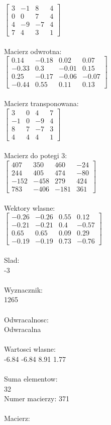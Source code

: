 \documentclass[a4paper,12pt]{article}
\begin{document}
$\begin{bmatrix} 3&-1&8&4\\0&0&7&4\\4&-9&-7&4\\7&4&3&1 \end{bmatrix}$
\\
\\
Macierz odwrotna:\\

$\begin{bmatrix} 0.14&-0.18&0.02&0.07\\-0.33&0.3&-0.01&0.15\\0.25&-0.17&-0.06&-0.07\\-0.44&0.55&0.11&0.13 \end{bmatrix}$
\\
\\
Macierz transponowana:\\

$\begin{bmatrix} 3&0&4&7\\-1&0&-9&4\\8&7&-7&3\\4&4&4&1 \end{bmatrix}$
\\
\\
Macierz do potegi 3:\\

$\begin{bmatrix} 407&350&460&-24\\244&405&474&-80\\-152&-458&279&424\\783&-406&-181&361 \end{bmatrix}$
\\
\\
Wektory wlasne:\\

$\begin{bmatrix} -0.26&-0.26&0.55&0.12\\-0.21&-0.21&0.4&-0.57\\0.65&0.65&0.09&0.29\\-0.19&-0.19&0.73&-0.76 \end{bmatrix}$
\\
\\
Slad:\\
-3
\\
\\
Wyznacznik:\\
1265
\\
\\
Odwracalnosc:\\
Odwracalna
\\
\\
Wartosci wlasne:\\
-6.84 -6.84 8.91 1.77
\\
\\
Suma elementow:\\
32
\\
\newpage
Numer macierzy:
371
\\
\\
Macierz:\\
\end{document}
